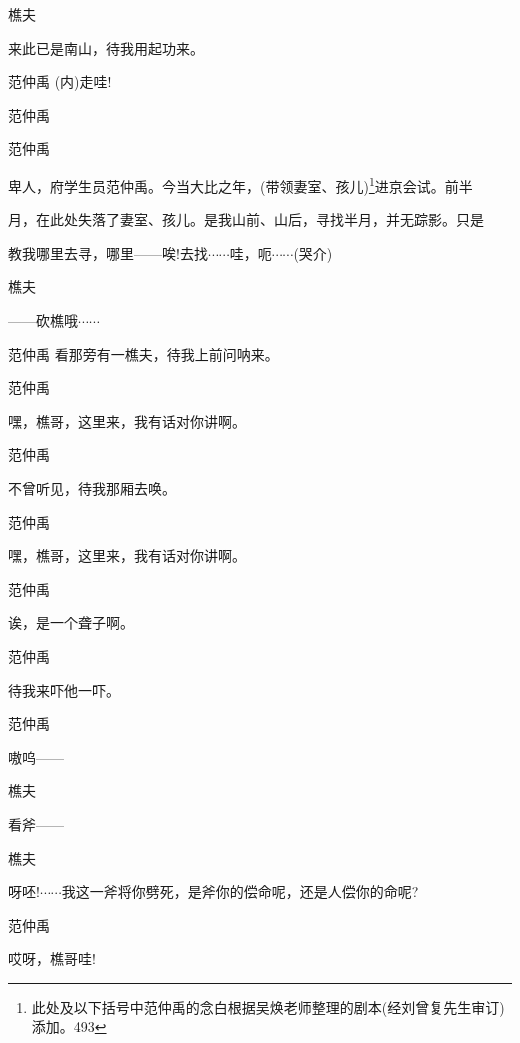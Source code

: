 {樵夫\hspace{30pt}~

来此已是南山，待我用起功来。}

{范仲禹} ({\akai 内}){走哇!}

范仲禹\hspace{20pt}~


范仲禹

卑人，府学生员范仲禹。今当大比之年，(带领妻室、孩儿)\footnote{ 此处及以下括号中范仲禹的念白根据吴焕老师整理的剧本(经刘曾复先生审订)添加。{493}}进京会试。前半

月，在此处失落了妻室、孩儿。是我山前、山后，寻找半月，并无踪影。只是

教我哪里去寻，哪里------唉!去找$\cdots{}\cdots{}$哇，呃$\cdots{}\cdots{}$(哭介)

{樵夫\hspace{30pt}~

------砍樵哦$\cdots{}\cdots{}$}

{范仲禹} 看那旁有一樵夫，待我上前问呐来。

范仲禹\hspace{20pt}~

嘿，樵哥，这里来，我有话对你讲啊。

范仲禹\hspace{20pt}~

不曾听见，待我那厢去唤。

范仲禹\hspace{20pt}~

嘿，樵哥，这里来，我有话对你讲啊。

范仲禹\hspace{20pt}~

诶，是一个聋子啊。

范仲禹\hspace{20pt}~

待我来吓他一吓。

范仲禹\hspace{20pt}~

嗷呜------

{樵夫\hspace{30pt}~

看斧------}

{樵夫

呀呸!$\cdots{}\cdots{}$我这一斧将你劈死，是斧你的偿命呢，还是人偿你的命呢?}

{范仲禹\hspace{20pt}~

哎呀，樵哥哇!}

